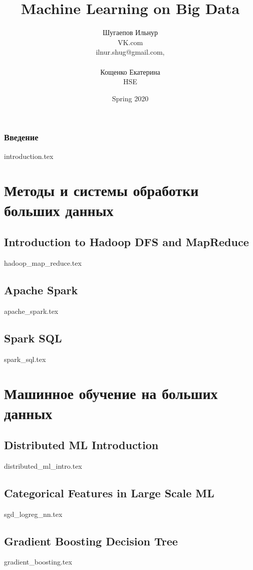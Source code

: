 \documentclass[openany,12pt]{book}
\title{Machine Learning on Big Data}
\author{Шугаепов Ильнур 
\\
\small{VK.com} 
\\
\small{ilnur.shug@gmail.com},
\\~\\
Кощенко Екатерина
\\
\small{HSE}
}
\date{Spring 2020}
\numberwithin{equation}{section}
\begin{document}
\maketitle

\tableofcontents

\section*{Введение}
{introduction.tex}
 
\part{Методы и системы обработки больших данных}
\chapter{Introduction to Hadoop DFS and MapReduce}
{hadoop_map_reduce.tex}

\chapter{Apache Spark}
{apache_spark.tex}

\chapter{Spark SQL}
{spark_sql.tex}

\part{Машинное обучение на больших данных}
\chapter{Distributed ML Introduction}
{distributed_ml_intro.tex}

\chapter{Categorical Features in Large Scale ML}
{sgd_logreg_nn.tex}

\chapter{Gradient Boosting Decision Tree}
{gradient_boosting.tex}
\end{document}

